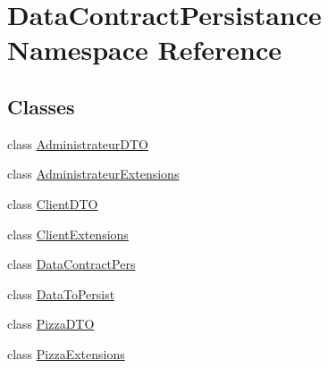 \hypertarget{namespaceDataContractPersistance}{}\section{Data\+Contract\+Persistance Namespace Reference}
\label{namespaceDataContractPersistance}
\subsection*{Classes}
\begin{DoxyCompactItemize}
\item 
class \hyperlink{classDataContractPersistance_1_1AdministrateurDTO}{Administrateur\+D\+TO}
\item 
class \hyperlink{classDataContractPersistance_1_1AdministrateurExtensions}{Administrateur\+Extensions}
\item 
class \hyperlink{classDataContractPersistance_1_1ClientDTO}{Client\+D\+TO}
\item 
class \hyperlink{classDataContractPersistance_1_1ClientExtensions}{Client\+Extensions}
\item 
class \hyperlink{classDataContractPersistance_1_1DataContractPers}{Data\+Contract\+Pers}
\item 
class \hyperlink{classDataContractPersistance_1_1DataToPersist}{Data\+To\+Persist}
\item 
class \hyperlink{classDataContractPersistance_1_1PizzaDTO}{Pizza\+D\+TO}
\item 
class \hyperlink{classDataContractPersistance_1_1PizzaExtensions}{Pizza\+Extensions}
\end{DoxyCompactItemize}
